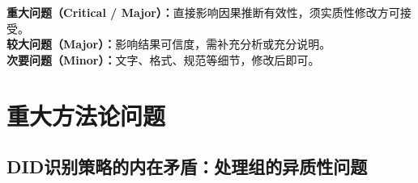 \documentclass[12pt, a4paper]{article}
\begin{document}
\begin{notebox}[评审定性说明]
\textbf{重大问题（Critical / Major）：}直接影响因果推断有效性，须实质性修改方可接受。\\
\textbf{较大问题（Major）：}影响结果可信度，需补充分析或充分说明。\\
\textbf{次要问题（Minor）：}文字、格式、规范等细节，修改后即可。
\end{notebox}

\clearpage

\section{重大方法论问题}

\subsection{DID识别策略的内在矛盾：处理组的异质性问题}
\label{sec:heterogeneous_treatment}
\end{document}
